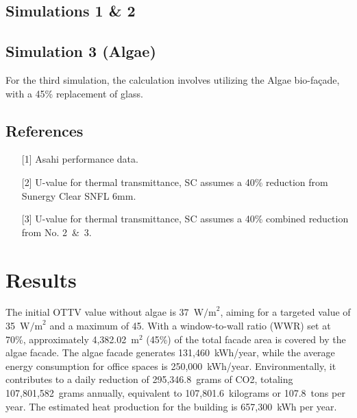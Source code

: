 \subsection*{
	Simulations 1 \& 2
}
%
\vspace*{0.5\baselineskip}%
\subsection*{
	Simulation 3 (Algae)
}
For the third simulation, the calculation involves utilizing the Algae bio-façade, with a 45\% replacement of glass.
\vspace*{0.5\baselineskip}%
%
\subsection*{
	References
}
\vspace*{-0.5\baselineskip}%
\begin{itemize}[noitemsep]
	\item[\hypertarget{ref:algae-ref1}{[1]}] Asahi performance data.
	\item[\hypertarget{ref:algae-ref2}{[2]}] U-value for thermal transmittance, SC assumes a 40\% reduction from Sunergy Clear SNFL 6mm.
	\item[\hypertarget{ref:algae-ref3}{[3]}] U-value for thermal transmittance, SC assumes a 40\% combined reduction from No. 2~\&~3.
\end{itemize}
\vfill
\section*{
  Results
 }
\vspace*{-\baselineskip}%
The initial OTTV value without algae is 37~$\text{W/m}^2$, aiming for a targeted value of 35~$\text{W/m}^2$ and a maximum of 45. With a window-to-wall ratio (WWR) set at 70\%, approximately 4,382.02~$\text{m}^2$ (45\%) of the total facade area is covered by the algae facade. The algae facade generates 131,460~kWh/year, while the average energy consumption for office spaces is 250,000~kWh/year. Environmentally, it contributes to a daily reduction of 295,346.8~grams of CO2, totaling 107,801,582~grams annually, equivalent to 107,801.6~kilograms or 107.8~tons per year. The estimated heat production for the building is 657,300~kWh per year.
\EndTwoColumnLayout
\newpage
